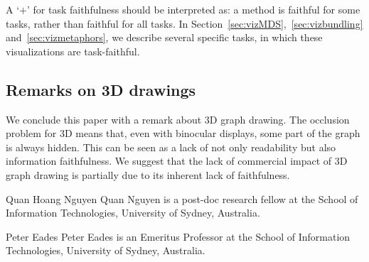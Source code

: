 \documentclass[10pt,journal,cspaper,compsoc]{IEEEtran}
\begin{document}
A `$+$' for task faithfulness should be interpreted as: a method is faithful for some tasks, rather than faithful for all tasks. In Section~\ref{sec:vizMDS},~\ref{sec:vizbundling} and~\ref{sec:vizmetaphors}, we describe several specific tasks, in which these visualizations are task-faithful.



\subsection{Remarks on 3D drawings}
We conclude this paper with a remark about 3D graph drawing. The occlusion problem for 3D means that, even
with binocular displays, some part of the graph is always hidden. This can be seen as a lack of not only readability but also information faithfulness. We suggest that the lack of commercial impact of 3D graph drawing is partially due to its inherent lack of faithfulness.





\vspace{-1cm}


\begin{IEEEbiographynophoto}{Quan Hoang Nguyen}
Quan Nguyen is a post-doc research fellow at the School of Information Technologies, University of Sydney, Australia.
\end{IEEEbiographynophoto}
\begin{IEEEbiographynophoto}{Peter Eades}
Peter Eades is an Emeritus Professor at the School of Information Technologies, University of Sydney, Australia.
\end{IEEEbiographynophoto}
\vfill

\clearpage
\enlargethispage{-5in}

\appendices
%
\end{document}
